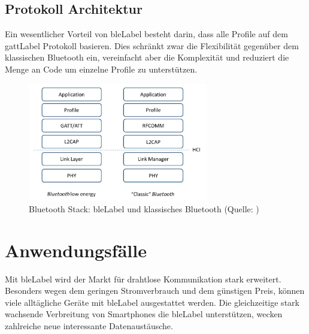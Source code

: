 \subsection{Protokoll Architektur}
Ein wesentlicher Vorteil von \gls{bleLabel} besteht darin, dass alle Profile auf dem \gls{gattLabel} Protokoll basieren.
Dies schränkt zwar die Flexibilität gegenüber dem klassischen Bluetooth ein, vereinfacht aber die Komplexität und reduziert die Menge an Code um einzelne Profile zu unterstützen.
\begin{figure}[H]
	\centering
	\includegraphics[width=0.7\textwidth]{images/ble/bluetooth_stack.png}
	\caption[Bluetooth Stack: \gls{bleLabel} und klassisches Bluetooth]{Bluetooth Stack: \gls{bleLabel} und klassisches Bluetooth (Quelle: \cite[][4]{ti_whitepaper_2015-05-08})}
\end{figure}


\section{Anwendungsfälle}
Mit \gls{bleLabel} wird der Markt für drahtlose Kommunikation stark erweitert.
Besonders wegen dem geringen Stromverbrauch und dem günstigen Preis, können viele alltägliche Geräte mit \gls{bleLabel} ausgestattet werden.
Die gleichzeitige stark wachsende Verbreitung von Smartphones die \gls{bleLabel} unterstützen, wecken zahlreiche neue interessante Datenaustäusche.

